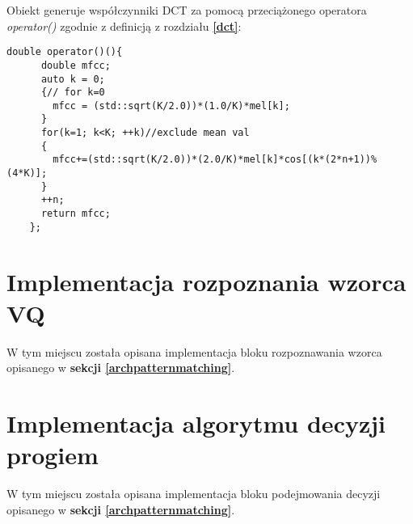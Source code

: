\begin{itemize}
Obiekt generuje współczynniki DCT za pomocą przeciążonego operatora \textit{operator()} zgodnie z definicją z rozdziału \textbf{\ref{dct}}:
 \begin{lstlisting}[style=lst:cpp]
    double operator()(){
      double mfcc;
      auto k = 0;
      {// for k=0
        mfcc = (std::sqrt(K/2.0))*(1.0/K)*mel[k];
      }
      for(k=1; k<K; ++k)//exclude mean val
      {
        mfcc+=(std::sqrt(K/2.0))*(2.0/K)*mel[k]*cos[(k*(2*n+1))%(4*K)]; 
      }
      ++n;
      return mfcc; 
    };
 \end{lstlisting}
\end{itemize}

\section{Implementacja rozpoznania wzorca VQ}

W tym miejscu została opisana implementacja bloku rozpoznawania wzorca opisanego w \textbf{sekcji \ref{archpatternmatching}}.

\section{Implementacja algorytmu decyzji progiem}

W tym miejscu została opisana implementacja bloku podejmowania decyzji opisanego w \textbf{sekcji \ref{archpatternmatching}}.
